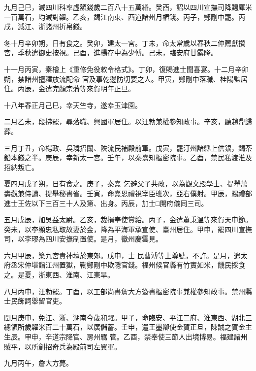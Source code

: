 \begin{pinyinscope}
 九月己巳，減四川科率虛額錢歲二百八十五萬緡。癸酉，詔以四川宣撫司降賜庫米一百萬石，均減對糴。乙亥，蠲江南東、西道諸州月樁錢。丙子，鄭剛中罷。丙戌，減江、浙諸州折帛錢。



 冬十月辛卯朔，日有食之。癸卯，建太一宮。丁未，命太常歲以春秋二仲薦獻攢宮，季秋遣御史按視。己酉，進楊存中為少傅。己未，臨安府甘露降。



 十一月丙寅，秦檜上《重修免役敕令格式》。丁卯，復賜進士聞喜宴。十二月辛卯朔，禁諸州擅釋放流配命
 官及事乾邊防切要之人。甲寅，鄭剛中落職、桂陽監居住。丙辰，金遣完顏宗藩等來賀明年正旦。



 十八年春正月己巳，幸天竺寺，遂幸玉津園。



 二月乙未，段拂罷，尋落職、興國軍居住。以汪勃兼權參知政事。辛亥，聽趙鼎歸葬。



 三月丁丑，命楊政、吳璘招關、陜流民補殿前軍。戊寅，罷汀州諸縣上供銀，蠲茶鉛本錢之半。庚辰，幸新太一宮。壬午，以秦熹知樞密院事。乙酉，禁民私渡淮及招納叛亡。



 夏四月戊子朔，日有食之。庚子，秦熹
 乞避父子共政，以為觀文殿學士、提舉萬壽觀兼侍讀、提舉秘書省。壬寅，命熹恩禮視宰臣班次，亞右僕射。甲辰，賜禮部進士王佐以下三百三十人及第、出身。丙辰，加士□開府儀同三司。



 五月戊辰，加吳益太尉。乙亥，裁損奉使賞給。丙子，金遣蕭秉溫等來賀天申節。癸未，以李顯忠私取故妻於金，降為平海軍承宣使、臺州居住。甲申，罷四川宣撫司，以李璆為四川安撫制置使。是月，徽州慶雲見。



 六月甲辰，築九宮貴神壇於東郊。戊申，士
 民曹溥等上尊號，不許。是月，遣太府丞宋仲堪詣江州置獄，鞫鄭剛中欺隱官錢。福州候官縣有竹實如米，饑民採食之。是夏，浙東西、淮南、江東旱。



 八月丙申，汪勃罷。丁酉，以工部尚書詹大方簽書樞密院事兼權參知政事。禁州縣士民飾詞舉留官吏。



 閏月庚申，免江、浙、湖南今歲和糴。甲子，命臨安、平江二府、淮東西、湖北三總領所歲糴米百二十萬石，以廣儲蓄。壬申，遣王墨卿使金賀正旦，陳誠之賀金主生辰。甲申，辛道宗降官、房州羈
 管。乙酉，禁奉使三節人出境博易。福建諸州賊平，以所創招奇兵為殿前司左翼軍。



 九月丙午，詹大方薨。




\end{pinyinscope}

